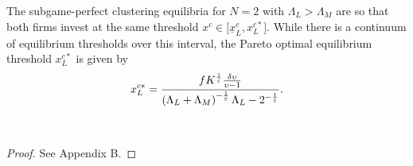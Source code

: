 \documentclass[nogrid,nosurname,sort&compress]{RFS}
\begin{document}


\begin{proposition}\label{p3}
The subgame-perfect clustering equilibria for $N=2$ with $\Lambda _{L}>\Lambda _{M}$ are so that
both firms invest at the same threshold $x^{c}\in \lbrack \underline{x}_{L}^{c},x_{L}^{c\ast }]$.
While there is a continuum of equilibrium thresholds over this interval, the Pareto optimal
equilibrium threshold $x_{L}^{c\ast }$ is given by
\begin{equation}
x_{L}^{c\ast }=\frac{fK^{\frac{1}{\varepsilon }}\frac{\delta \upsilon }{%
\upsilon -1}}{\left( \Lambda _{L}+\Lambda _{M}\right) ^{-\frac{1}{%
\varepsilon }}\Lambda _{L}-2^{-\frac{1}{\varepsilon }}}.  \label{xc}
\end{equation}
\label{proposition clustering}
\end{proposition}
\ \vspace*{-24pt}
\begin{proof}
See Appendix B.
\end{proof}
\end{document}
